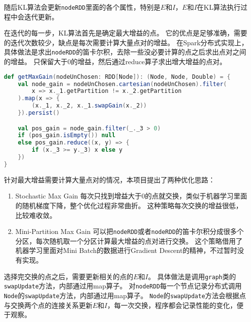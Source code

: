 随后KL算法会更新\texttt{nodeRDD}里面的各个属性，特别是$E$和$I$，$E$和$I$在KL算法执行过程中会迭代更新。

在迭代的每一步，KL算法首先是确定最大增益的点。
它的优点是足够准确，需要的迭代次数较少，缺点是每次需要计算大量点对的增益。
在Spark分布式实现上，具体做法是求出\texttt{nodeRDD}的笛卡尔积，去除一些没必要计算的点之后求出点对之间的增益。
只保留大于$0$的增益，然后通过reduce算子求出增大增益的点对。

\begin{lstlisting}[language=Scala]
def getMaxGain(nodeUnChosen: RDD[Node]): (Node, Node, Double) = {
    val node_gain = nodeUnChosen.cartesian(nodeUnChosen).filter(
        x => x._1.getPartition != x._2.getPartition
    ).map(x => {
        (x._1, x._2, x._1.swapGain(x._2))
    }).persist()

    val pos_gain = node_gain.filter(_._3 > 0)
    if (pos_gain.isEmpty()) null
    else pos_gain.reduce((x, y) => {
        if (x._3 >= y._3) x else y
    })
}
\end{lstlisting}

针对最大增益需要计算大量点对的情况，本项目提出了两种优化思路：

\begin{enumerate}
    \item Stochastic Max Gain
    每次只找到增益大于$0$的点就交换，类似于机器学习里面的随机梯度下降，整个优化过程非常曲折。
    这种策略每次交换的增益很低，比较难收敛。

    \item Mini-Partition Max Gain
    可以把\texttt{nodeRDD}或者\texttt{nodeRDD}的笛卡尔积分成很多个分区，每次随机取一个分区计算最大增益的点对进行交换。
    这个策略借用了机器学习里面对Mini Batch的数据进行Gradient Descent的精神，不过暂时没有实现。
\end{enumerate}

选择完交换的点之后，需要更新相关的点的$E$和$I$。
具体做法是调用\texttt{graph}类的\texttt{swapUpdate}方法，内部通过用map算子。
对\texttt{nodeRDD}每一个节点记录分布式调用\texttt{Node}的\texttt{swapUpdate}方法，内部通过用map算子。
\texttt{Node}的\texttt{swapUpdate}方法会根据点与交换两个点的连接关系更新$E$和$I$，每一次交换，程序都会记录性能的变化，便于观察。


